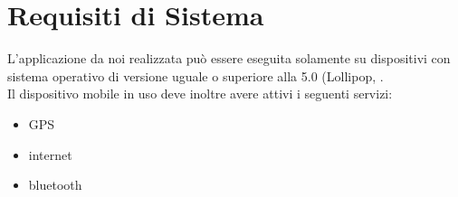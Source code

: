 \section{Requisiti di Sistema} 
L'applicazione da noi realizzata può essere eseguita solamente su dispositivi  con sistema operativo  di versione uguale o superiore alla 5.0 (Lollipop, . \\
Il dispositivo mobile in uso deve inoltre avere attivi i seguenti servizi:
\begin{itemize}
	\item GPS
	\item internet
	\item bluetooth
\end{itemize} 